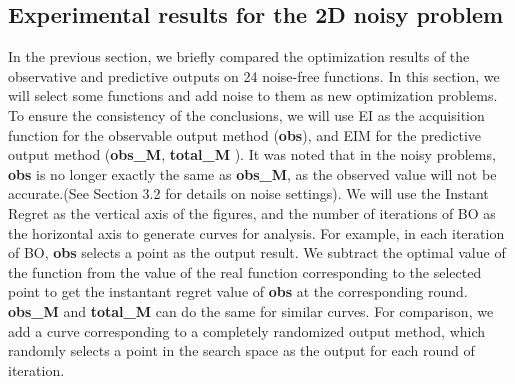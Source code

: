 \documentclass{article}
\begin{document}
  \subsection{Experimental results for the 2D noisy problem}
  \hspace{2em}In the previous section, we briefly compared the optimization results of the observative and predictive outputs on 24 noise-free functions. In this section, we will select some functions and add noise to them as new optimization problems. To ensure the consistency of the conclusions, we will use EI as the acquisition function for the observable output method (\textbf{obs}), and EIM for the predictive output method (\textbf{obs\_M}, \textbf{total\_M} ). It was noted that in the noisy problems, \textbf{obs} is no longer exactly the same as \textbf{obs\_M}, as the observed value will not be accurate.(See Section 3.2 for details on noise settings). We will use the Instant Regret as the vertical axis of the figures, and the number of iterations of BO as the horizontal axis to generate curves for analysis. For example, in each iteration of BO, \textbf{obs} selects a point as the output result. We subtract the optimal value of the function from the value of the real function corresponding to the selected point to get the instantant regret value of \textbf{obs} at the corresponding round. \textbf{obs\_M} and \textbf{total\_M} can do the same for similar curves. For comparison, we add a curve corresponding to a completely randomized output method, which randomly selects a point in the search space as the output for each round of iteration.
  
\end{document}
